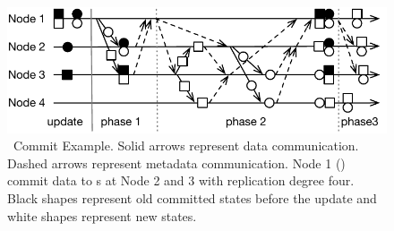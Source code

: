 {
\begin{figure}[t]
\begin{center}
\centerline{\includegraphics[width=\textwidth]{hotpot/Figures/commit.pdf}}
\caption[\mrmw\ Commit Example.]
{
\mrmw\ Commit Example.
Solid arrows represent data communication.
Dashed arrows represent metadata communication.
Node 1 (\xn) commit data to \on{}s at Node 2 and 3 with replication degree four.
Black shapes represent old committed states before the update
and white shapes represent new states.
}
\label{fig-mrmw}
\end{center}
\end{figure}
}
